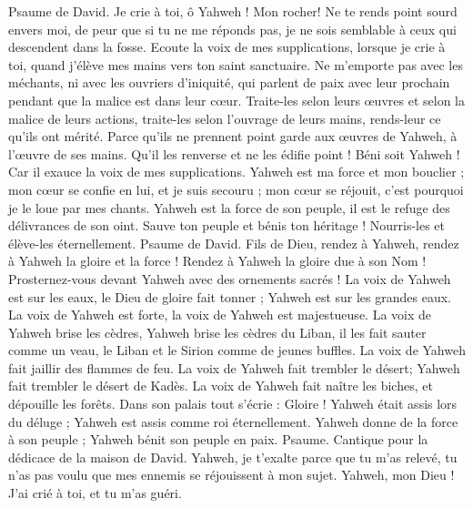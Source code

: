 \begin{multicols}{2}
\VerseOne{}Psaume de David. Je crie à toi, ô Yahweh ! Mon rocher! Ne te rends point sourd envers moi, de peur que si tu ne me réponds pas, je ne sois semblable à ceux qui descendent dans la fosse.
Ecoute la voix de mes supplications, lorsque je crie à toi, quand j'élève mes mains vers ton saint sanctuaire.
Ne m'emporte pas avec les méchants, ni avec les ouvriers d'iniquité, qui parlent de paix avec leur prochain pendant que la malice est dans leur cœur.
Traite-les selon leurs œuvres et selon la malice de leurs actions, traite-les selon l'ouvrage de leurs mains, rends-leur ce qu'ils ont mérité.
Parce qu'ils ne prennent point garde aux œuvres de Yahweh, à l'œuvre de ses mains. Qu'il les renverse et ne les édifie point !
Béni soit Yahweh ! Car il exauce la voix de mes supplications.
Yahweh est ma force et mon bouclier ; mon cœur se confie en lui, et je suis secouru ; mon cœur se réjouit, c'est pourquoi je le loue par mes chants.
Yahweh est la force de son peuple, il est le refuge des délivrances de son oint.
Sauve ton peuple et bénis ton héritage ! Nourris-les et élève-les éternellement.
\VerseOne{}Psaume de David. Fils de Dieu, rendez à Yahweh, rendez à Yahweh la gloire et la force !
Rendez à Yahweh la gloire due à son Nom ! Prosternez-vous devant Yahweh avec des ornements sacrés !
La voix de Yahweh est sur les eaux, le Dieu de gloire fait tonner ; Yahweh est sur les grandes eaux.
La voix de Yahweh est forte, la voix de Yahweh est majestueuse.
La voix de Yahweh brise les cèdres, Yahweh brise les cèdres du Liban,
il les fait sauter comme un veau, le Liban et le Sirion comme de jeunes buffles.
La voix de Yahweh fait jaillir des flammes de feu.
La voix de Yahweh fait trembler le désert; Yahweh fait trembler le désert de Kadès.
La voix de Yahweh fait naître les biches, et dépouille les forêts. Dans son palais tout s'écrie : Gloire !
Yahweh était assis lors du déluge ; Yahweh est assis comme roi éternellement.
Yahweh donne de la force à son peuple ; Yahweh bénit son peuple en paix.
\VerseOne{}Psaume. Cantique pour la dédicace de la maison de David.
Yahweh, je t'exalte parce que tu m'as relevé, tu n'as pas voulu que mes ennemis se réjouissent à mon sujet.
Yahweh, mon Dieu ! J'ai crié à toi, et tu m'as guéri.

\end{multicols}
